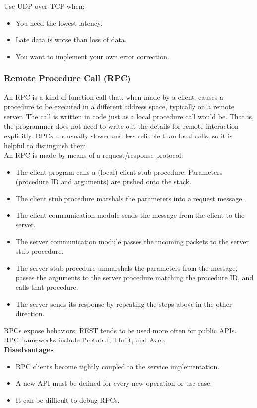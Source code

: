 \documentclass[12pt, titlepage]{article}
\begin{document}
Use UDP over TCP when:
\begin{itemize}
  \item You need the lowest latency.
  \item Late data is worse than loss of data.
  \item You want to implement your own error correction.
\end{itemize}

\subsubsection{Remote Procedure Call (RPC)}

An RPC is a kind of function call that, when made by a client, causes a procedure to be executed in a different address space, typically on a remote server. The call is written in code just as a local procedure call would be. That is, the programmer does not need to write out the details for remote interaction explicitly. RPCs are usually slower and less reliable than local calls, so it is helpful to distinguish them. \\

An RPC is made by means of a request/response protocol:
\begin{itemize}
  \item The client program calls a (local) client stub procedure. Parameters (procedure ID and arguments) are pushed onto the stack.
  \item The client stub procedure marshals the parameters into a request message.
  \item The client communication module sends the message from the client to the server.
  \item The server communication module passes the incoming packets to the server stub procedure.
  \item The server stub procedure unmarshals the parameters from the message, passes the arguments to the server procedure matching the procedure ID, and calls that procedure.
  \item The server sends its response by repeating the steps above in the other direction.
\end{itemize}

RPCs expose behaviors. REST tends to be used more often for public APIs. \\

RPC frameworks include Protobuf, Thrift, and Avro. \\

\textbf{Disadvantages}
\begin{itemize}
  \item RPC clients become tightly coupled to the service implementation.
  \item A new API must be defined for every new operation or use case.
  \item It can be difficult to debug RPCs.
\end{itemize}
\end{document}
